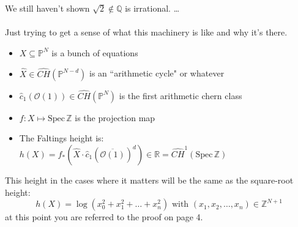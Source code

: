 \documentclass[12pt]{article}
\begin{document}
\noindent We still haven't shown $\sqrt{2} \notin \mathbb{Q}$ is irrational. \dots \\ \\
Just trying to get a sense of what this machinery is like and why it's there.  
\begin{itemize}
\item $X \subseteq \mathbb{P}^N$ is a bunch of equations
\item $\hat{X} \in \widehat{CH}(\mathbb{P}^{N-d}) $ is an ``arithmetic cycle" or whatever
\item $\hat{c}_1(\mathcal{O}(1))\in \widehat{CH}(\mathbb{P}^N) $ is the first arithmetic chern class 
\item $f : X \mapsto \mathrm{Spec}\, \mathbb{Z}$ is the projection map
\item The Faltings height is: $ h(X) = f_\ast (\hat{X} \cdot \hat{c}_1(\overline{\mathcal{O}(1)})^d) \in \mathbb{R} = \widehat{CH}^1(\mathrm{Spec}\, \mathbb{Z})$
\end{itemize}
This height in the cases where it matters will be the same as the square-root height:
$$ h(X) = \log (x_0^2 + x_1^2 + \dots + x_n^2)  \text{ with } (x_1, x_2, \dots, x_n) \in \mathbb{Z}^{N+1} $$
at this point you are referred to the proof on page {\color{blue} 4}. \\ \\
\end{document}
